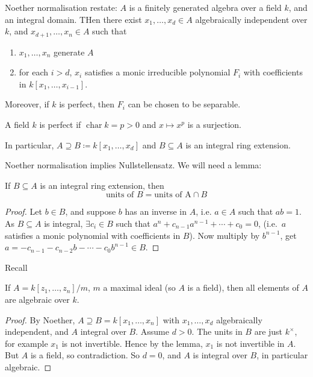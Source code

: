 \documentclass{article}
\DeclareMathOperator{\chara}{char}
\begin{document}
Noether normalisation restate: $A$ is a finitely generated algebra over a field $k$, and an integral domain. THen there exist $x_1, \dotsc, x_d \in A$ algebraically independent over $k$, and $x_{d+1}, \dotsc, x_n \in A$ such that
\begin{enumerate}[label=(\roman*)]
    \item $x_1, \dotsc, x_n$ generate $A$
    \item for each $i > d$, $x_i$ satisfies a monic irreducible polynomial $F_i$ with coefficients in $k[x_1, \dotsc, x_{i-1}]$.
\end{enumerate}
Moreover, if $k$ is perfect, then $F_i$ can be chosen to be separable.
\begin{defi}[Perfect]
    A field $k$ is perfect if $\chara k = p > 0$ and $x \mapsto x^p$ is a surjection.
\end{defi}
\begin{remark}
    In particular, $A \supseteq B \coloneqq k[x_1, \dotsc, x_d]$ and $B \subseteq A$ is an integral ring extension.
\end{remark}
Noether normalisation implies Nullstellensatz.
We will need a lemma:
\begin{lemma}
    If $B \subseteq A$ is an integral ring extension, then
    \begin{equation*}
        \text{units of } B = \text{units of A} \cap B
    \end{equation*}
\end{lemma}
\begin{proof}
    Let $b \in B$, and suppose $b$ has an inverse in $A$, i.e. $a \in A$ such that $ab = 1$.
    As $B \subseteq A$ is integral, $\exists c_i \in B$ such that $a^n + c_{n-1} a^{n-1} + \dotsb + c_0 = 0$, (i.e.\ $a$ satisfies a monic polynomial with coefficients in $B$).
    Now multiply by $b^{n-1}$, get $a = -c_{n-1} - c_{n-2} b - \dotsb - c_0 b^{n-1} \in B$.
\end{proof}
Recall
\begin{thm}[Nullstellensatz]
    If $A = k[z_1, \dotsc, z_n]/m$, $m$ a maximal ideal (so $A$ is a field), then all elements of $A$ are algebraic over $k$.
\end{thm}
\begin{proof}
    By Noether, $A \supseteq B = k[x_1, \dotsc, x_n]$ with $x_1, \dotsc, x_d$ algebraically independent, and $A$ integral over $B$.
    Assume $d > 0$.  The units in $B$ are just $k^\times$, for example $x_1$ is not invertible.
    Hence by the lemma, $x_1$ is not invertible in $A$. But $A$ is a field, so contradiction.
    So $d = 0$, and $A$ is integral over $B$, in particular algebraic.
\end{proof}
\end{document}
